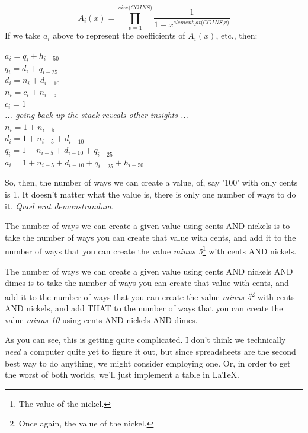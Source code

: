 \begin{equation*}
A_i(x) = \prod_{v=1}^{\textit{size(COINS)}} \displaystyle \frac{1}{1-x^{\textit{element\_at(COINS,v)}}}
\end{equation*}
If we take $a_i$ above to represent the coefficients of $A_i(x)$, etc., then:
\begin{center}
$a_i = q_i + h_{i-50}$ \\
$q_i = d_i + q_{i-25}$ \\
$d_i = n_i + d_{i-10}$ \\
$n_i = c_i + n_{i-5}$ \\
$c_i = 1$ \\[1em]
\textit{... going back up the stack reveals other insights ...} \\
$n_i = 1 + n_{i-5}$ \\
$d_i = 1 + n_{i-5} + d_{i-10}$ \\
$q_i = 1 + n_{i-5} + d_{i-10} + q_{i-25}$ \\
$a_i = 1 + n_{i-5} + d_{i-10} + q_{i-25} + h_{i-50}$
\end{center}
So, then, the number of ways we can create a value, of, say '100' with only cents is 1.  It doesn't matter what the value is, there is only one number of ways to do it.  \textit{Quod erat demonstrandum}.

The number of ways we can create a given value using cents AND nickels is to take the number of ways you can create that value with cents, and add it to the number of ways that you can create the value \textit{minus 5}\footnote{The value of the nickel.} with cents AND nickels.  

The number of ways we can create a given value using cents AND nickels AND dimes is to take the number of ways you can create that value with cents, and add it to the number of ways that you can create the value \textit{minus 5}\footnote{Once again, the value of the nickel.} with cents AND nickels, and add THAT to the number of ways that you can create the value \textit{minus 10} using cents AND nickels AND dimes.  

As you can see, this is getting quite complicated.  I don't think we technically \textit{need} a computer quite yet to figure it out, but since spreadsheets are the second best way to do anything, we might consider employing one.  Or, in order to get the worst of both worlds, we'll just implement a table in \LaTeX.

